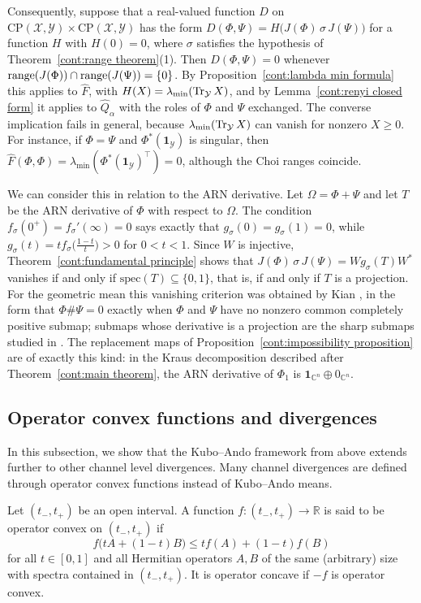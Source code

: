 Consequently, suppose that a real-valued function $D$ on $\mathrm{CP}(\mathcal{X},\mathcal{Y})\times\mathrm{CP}(\mathcal{X},\mathcal{Y})$ has the form $D(\Phi,\Psi)=H\big(J(\Phi)\,\sigma\,J(\Psi)\big)$ for a function $H$ with $H(0)=0$, where $\sigma$ satisfies the hypothesis of Theorem~\ref{cont:range theorem}(1). Then $D(\Phi,\Psi)=0$ whenever $\operatorname{range}(J(\Phi))\cap\operatorname{range}(J(\Psi))=\{0\}$. By Proposition~\ref{cont:lambda min formula} this applies to $\widehat{F}$, with $H(X)=\lambda_{\min}(\operatorname{Tr}_{\mathcal{Y}}X)$, and by Lemma~\ref{cont:renyi closed form} it applies to $\widehat{Q}_\alpha$ with the roles of $\Phi$ and $\Psi$ exchanged. The converse implication fails in general, because $\lambda_{\min}(\operatorname{Tr}_{\mathcal{Y}}X)$ can vanish for nonzero $X\geq0$. For instance, if $\Phi=\Psi$ and $\Phi^*(\mathbf{1}_{\mathcal{Y}})$ is singular, then $\widehat{F}(\Phi,\Phi)=\lambda_{\min}(\Phi^*(\mathbf{1}_{\mathcal{Y}})^\top)=0$, although the Choi ranges coincide.
 
We can consider this in relation to the ARN derivative. Let $\Omega=\Phi+\Psi$ and let $T$ be the ARN derivative of $\Phi$ with respect to $\Omega$. The condition $f_\sigma(0^+)=f_\sigma'(\infty)=0$ says exactly that $g_\sigma(0)=g_\sigma(1)=0$, while $g_\sigma(t)=tf_\sigma\big(\tfrac{1-t}{t}\big)>0$ for $0<t<1$. Since $W$ is injective, Theorem~\ref{cont:fundamental principle} shows that $J(\Phi)\,\sigma\,J(\Psi)=Wg_\sigma(T)W^*$ vanishes if and only if $\mathrm{spec}(T)\subseteq\{0,1\}$, that is, if and only if $T$ is a projection. For the geometric mean this vanishing criterion was obtained by Kian \cite{kian2026relative}, in the form that $\Phi\#\Psi=0$ exactly when $\Phi$ and $\Psi$ have no nonzero common completely positive submap; submaps whose derivative is a projection are the sharp submaps studied in \cite{Kian2026sharpness}. The replacement maps of Proposition~\ref{cont:impossibility proposition} are of exactly this kind: in the Kraus decomposition described after Theorem~\ref{cont:main theorem}, the ARN derivative of $\Phi_1$ is $\mathbf{1}_{\mathbb{C}^n}\oplus0_{\mathbb{C}^n}$.
 
\subsection{Operator convex functions and divergences}
In this subsection, we show that the Kubo--Ando framework from above extends further to other channel level divergences. Many channel divergences are defined through operator convex functions instead of Kubo--Ando means.
\begin{definition}
Let $(t_-,t_+)$ be an open interval. A function $f:(t_-,t_+)\to\mathbb{R}$ is said to be operator convex on $(t_-,t_+)$ if
\[
    f\big(tA+(1-t)B\big)\leq t f(A)+(1-t)f(B)
\]
for all $t\in[0,1]$ and all Hermitian operators $A,B$ of the same (arbitrary) size with spectra contained in $(t_-,t_+)$. It is operator concave if $-f$ is operator convex.
\end{definition}
 
